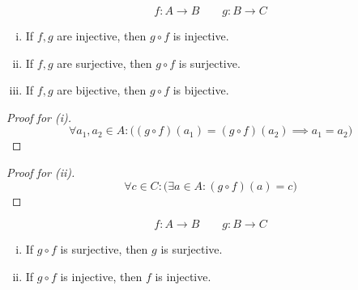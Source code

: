 \begin{frame}{}
  \begin{theorem}[UD Theorem 16.7]
    \[
      f: A \to B \qquad g: B \to C
    \]

    \begin{enumerate}[(i)]
      \item If $f, g$ are injective, then $g \circ f$ is injective.
      \item If $f, g$ are surjective, then $g \circ f$ is surjective.
      \item If $f, g$ are bijective, then $g \circ f$ is bijective.
    \end{enumerate}
  \end{theorem}

  \pause
  \vspace{0.30cm}
  \begin{proof}[Proof for (i)]
    \[
      \forall a_1, a_2 \in A: \Big( (g \circ f)(a_1) = (g \circ f)(a_2) \implies a_1 = a_2 \Big)
    \]
  \end{proof}

  \pause
  \vspace{0.30cm}
  \begin{proof}[Proof for (ii)]
    \[
      \forall c \in C: \Big( \exists a \in A: (g \circ f)(a) = c \Big)
    \]
  \end{proof}
\end{frame}

\begin{frame}{}
  \begin{theorem}[UD Theorem 16.8]
    \[
      f: A \to B \qquad g: B \to C
    \]

    \begin{enumerate}[(i)]
      \item If $g \circ f$ is surjective, then $g$ is surjective.
      \item If $g \circ f$ is injective, then $f$ is injective.
    \end{enumerate}
  \end{theorem}

  \pause
  \vspace{0.30cm}
  \begin{center}
  \end{center}
\end{frame}
